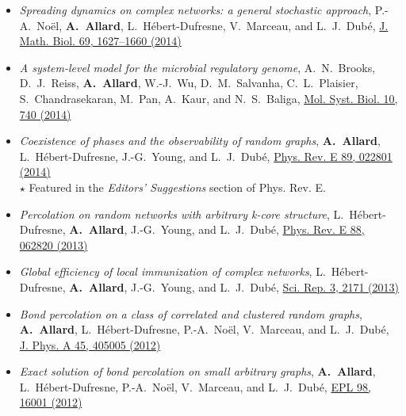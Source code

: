 \documentclass[11pt]{article}
\begin{document}
\begin{itemize}
%
  \item \textit{Spreading dynamics on complex networks: a general stochastic approach}, P.-A.~No\"el, \textbf{A.~Allard}, L.~H\'ebert-Dufresne, V.~Marceau, and L.~J.~Dub\'e, \href{http://dx.doi.org/10.1007/s00285-013-0744-9}{J. Math. Biol. 69, 1627--1660 (2014)}%
%
  \item \textit{A system-level model for the microbial regulatory genome}, A.~N.~Brooks, D.~J.~Reiss, \textbf{A.~Allard}, W.-J.~Wu, D.~M.~Salvanha, C.~L.~Plaisier, S.~Chandrasekaran, M.~Pan, A.~Kaur, and N.~S.~Baliga, \href{http://dx.doi.org/10.15252/msb.20145160}{Mol. Syst. Biol. 10, 740 (2014)}%
%
  \item \textit{Coexistence of phases and the observability of random graphs}, \textbf{A.~Allard}, L.~H\'ebert-Dufresne, J.-G.~Young, and L.~J.~Dub\'e, \href{http://dx.doi.org/10.1103/PhysRevE.89.022801}{Phys. Rev. E 89, 022801 (2014)}\\%
  {\footnotesize $\star$ Featured in the \textit{Editors' Suggestions} section of Phys. Rev. E.}
%
  \item\textit{Percolation on random networks with arbitrary k-core structure}, L.~H\'ebert-Dufresne\textsuperscript{}, \textbf{A.~Allard}\textsuperscript{}, J.-G.~Young, and L.~J.~Dub\'e, \href{http://dx.doi.org/10.1103/PhysRevE.88.062820}{Phys. Rev. E 88, 062820 (2013)}%
%
  \item \textit{Global efficiency of local immunization of complex networks}, L.~H\'ebert-Dufresne\textsuperscript{}, \textbf{A.~Allard}\textsuperscript{}, J.-G.~Young\textsuperscript{}, and L.~J.~Dub\'e, \href{http://dx.doi.org/10.1038/srep02171}{Sci. Rep. 3, 2171 (2013)}%
%
  \item \textit{Bond percolation on a class of correlated and clustered random graphs}, \textbf{A.~Allard}, L.~H\'ebert-Dufresne, P.-A.~No\"el, V.~Marceau, and L.~J.~Dub\'e, \href{http://dx.doi.org/10.1088/1751-8113/45/40/405005}{J. Phys. A 45, 405005 (2012)}%
%
  \item \textit{Exact solution of bond percolation on small arbitrary graphs}, \textbf{A.~Allard}, L.~H\'ebert-Dufresne, P.-A.~No\"el, V.~Marceau, and L.~J.~Dub\'e, \href{http://dx.doi.org/10.1209/0295-5075/98/16001}{EPL 98, 16001 (2012)}%

\end{itemize}
\end{document}
